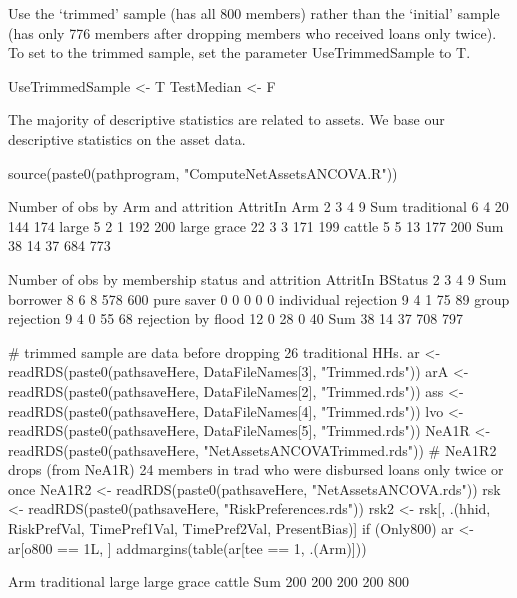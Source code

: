 Use the `trimmed' sample (has all 800 members) rather than the `initial' sample (has only 776 members after dropping members who received loans only twice). To set to the trimmed sample, set the parameter \textsf{UseTrimmedSample} to T.
\begin{Schunk}
\begin{Sinput}
UseTrimmedSample <- T
TestMedian <- F
\end{Sinput}
\end{Schunk}

The majority of descriptive statistics are related to assets. We base our descriptive statistics on the asset data.

\begin{Schunk}
\begin{Sinput}
source(paste0(pathprogram, "ComputeNetAssetsANCOVA.R"))
\end{Sinput}
\begin{Soutput}


Number of obs by Arm and attrition
             AttritIn
Arm             2   3   4   9 Sum
  traditional   6   4  20 144 174
  large         5   2   1 192 200
  large grace  22   3   3 171 199
  cattle        5   5  13 177 200
  Sum          38  14  37 684 773


Number of obs by membership status and attrition
                      AttritIn
BStatus                  2   3   4   9 Sum
  borrower               8   6   8 578 600
  pure saver             0   0   0   0   0
  individual rejection   9   4   1  75  89
  group rejection        9   4   0  55  68
  rejection by flood    12   0  28   0  40
  Sum                   38  14  37 708 797
\end{Soutput}
\end{Schunk}
\begin{Schunk}
\begin{Sinput}
#  trimmed sample are data before dropping 26 traditional HHs.
ar <- readRDS(paste0(pathsaveHere, DataFileNames[3], "Trimmed.rds"))
arA <- readRDS(paste0(pathsaveHere, DataFileNames[2], "Trimmed.rds"))
ass <- readRDS(paste0(pathsaveHere, DataFileNames[4], "Trimmed.rds"))
lvo <- readRDS(paste0(pathsaveHere, DataFileNames[5], "Trimmed.rds"))
NeA1R <- readRDS(paste0(pathsaveHere, "NetAssetsANCOVATrimmed.rds"))
# NeA1R2 drops (from NeA1R) 24 members in trad who were disbursed loans only twice or once
NeA1R2 <- readRDS(paste0(pathsaveHere, "NetAssetsANCOVA.rds"))
rsk <- readRDS(paste0(pathsaveHere, "RiskPreferences.rds"))
rsk2 <- rsk[, .(hhid, RiskPrefVal, TimePref1Val, TimePref2Val, PresentBias)]
if (Only800) ar <- ar[o800 == 1L, ]
addmargins(table(ar[tee == 1, .(Arm)]))
\end{Sinput}
\begin{Soutput}
Arm
traditional       large large grace      cattle         Sum 
        200         200         200         200         800 
\end{Soutput}
\end{Schunk}
